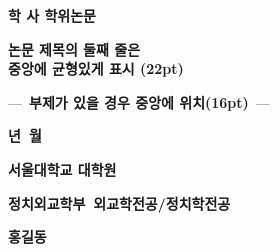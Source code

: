 \newcommand{\thesistitle}{논문 제목의 둘째 줄은\\ 중앙에 균형있게 표시 (22pt)}                                     %
\newcommand{\thesissubtitle}{부제가 있을 경우 중앙에 위치(16pt)}                                  %
\newcommand{\degreename}{\textbigcircle 학 \textbigcircle 사 학위논문}
\newcommand{\submissionmonth}{월}                                 %
\newcommand{\submissionyear}{년}                                  %
\newcommand{\graduateschool}{서울대학교 대학원}
\newcommand{\department}{정치외교학부}
\newcommand{\authorname}{홍길동}                                      %

\begin{titlepage}
  \centering
  {\fontsize{14pt}{14pt}\selectfont  \textbf{\degreename}\par}
  \vspace{14pt}
  \vspace{14pt}
  \vspace{14pt}
  \vspace{14pt}
  {\fontsize{22pt}{22pt}\selectfont \textbf{\thesistitle}\par}
  {\fontsize{16pt}{16pt}\selectfont ---\ \textbf{\thesissubtitle}\ ---\par}
  \vspace{16pt}
  \vspace{16pt}
  \vspace{16pt}
  \vspace{16pt}
  \vspace{16pt}
  \vspace{16pt}
  \vspace{16pt}
  \vspace{16pt}
  \vspace{16pt}
  \vspace{16pt}
  \vspace{16pt}
  \vspace{16pt}
  {\fontsize{14pt}{14pt}\selectfont  
  \textbf{\submissionyear\ \submissionmonth}\par}
  \vfill
  {\fontsize{16pt}{16pt}\selectfont  \textbf{\graduateschool}\par}
  \vspace{14pt}
  {\fontsize{16pt}{16pt}\selectfont  \textbf{\department\ 외교학전공/정치학전공}\par}
  \vspace{14pt}
  {\fontsize{16pt}{16pt}\selectfont \textbf{\authorname}\par}
  \vspace{16pt}
  \vspace{16pt}
\end{titlepage}

